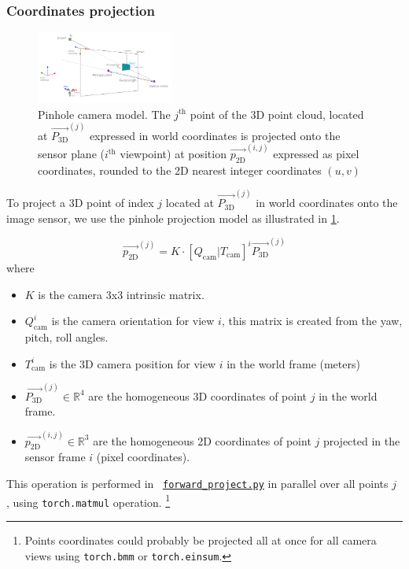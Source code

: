 \subsubsection{Coordinates projection}
\label{sec:coordinates_projection}

\begin{figure}[H]
    \centering
    \includegraphics[width=0.4\textwidth]{figures/pinhole_camera_with_angles.png}
    \caption{Pinhole camera model. The $j^\text{th}$ point of the 3D point cloud, located at $\vec{P_{\textrm{3D}}}^{(j)}$ expressed in world coordinates is projected onto the sensor plane ($i^\text{th}$  viewpoint) at position $\vec{p_{\textrm{2D}}}^{(i,j)}$ expressed as pixel coordinates, rounded to the 2D nearest integer coordinates $(u,v)$}
    \label{fig:pinhole_camera}
\end{figure}


To project a 3D point of index $j$ located at $\vec{P_{\textrm{3D}}}^{(j)}$ in world coordinates onto the image sensor,
we use the pinhole projection model as illustrated in \ref{fig:pinhole_camera}.

$$\vec{p_{\textrm{2D}}}^{(j)} = K\cdot\left[Q_{\text{cam}} | T_{\text{cam}}\right]^{i}\vec{P_{\textrm{3D}}}^{(j)}$$
where
\begin{itemize}
    \item $K$ is the camera 3x3 intrinsic matrix.
    \item $Q_{\textrm{cam}}^{i}$ is the camera orientation for view $i$, this matrix is created from the yaw, pitch, roll angles.
    \item $T_{\textrm{cam}}^{i}$ is the 3D camera position for view $i$ in the world frame (meters)
    \item $\vec{P_{\textrm{3D}}}^{(j)} \in \mathbb{R}^{4}$ are the homogeneous 3D coordinates of point $j$ in the world frame.
    \item $\vec{p_{\textrm{2D}}}^{(i,j)} \in \mathbb{R}^{3}$ are the homogeneous 2D coordinates of point $j$ projected in the sensor frame $i$ (pixel coordinates).
\end{itemize}

This operation is performed in ~\href{https://github.com/balthazarneveu/per-pixel-point-rendering/blob/main/src/pixr/rendering/forward_project.py}{\texttt{forward\_project.py}} in parallel over all points $j$ , using \texttt{torch.matmul} operation. \footnote{Points coordinates could probably be projected all at once for all camera views using \texttt{torch.bmm} or \texttt{torch.einsum}.}


